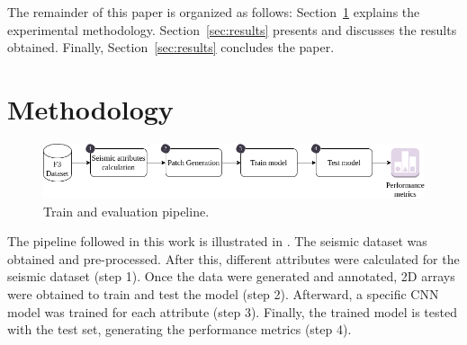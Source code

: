 \documentclass[conference]{IEEEtran}
\begin{document}
The remainder of this paper is organized as follows: 
Section~\ref{sec:methodology} explains the experimental methodology.
Section~\ref{sec:results} presents and discusses the results obtained. Finally, Section~\ref{sec:results} concludes the paper.

\section{Methodology}
\label{sec:methodology}
\begin{figure}[!t]
    \centering
    \includegraphics[width=2.0\columnwidth]{Fig/pipeline.png}
    \caption{Train and evaluation pipeline.}
    \label{fig:pipeline}
\end{figure}

The pipeline followed in this work is illustrated in . The seismic dataset was obtained and pre-processed. 
After this, different attributes were calculated for the seismic dataset (step 1). Once the data were generated and annotated, 2D arrays were obtained to train and test the model (step 2). 
Afterward, a specific CNN model was trained for each attribute (step 3). 
Finally, the trained model is tested with the test set, generating the performance metrics (step 4).

\end{document}
